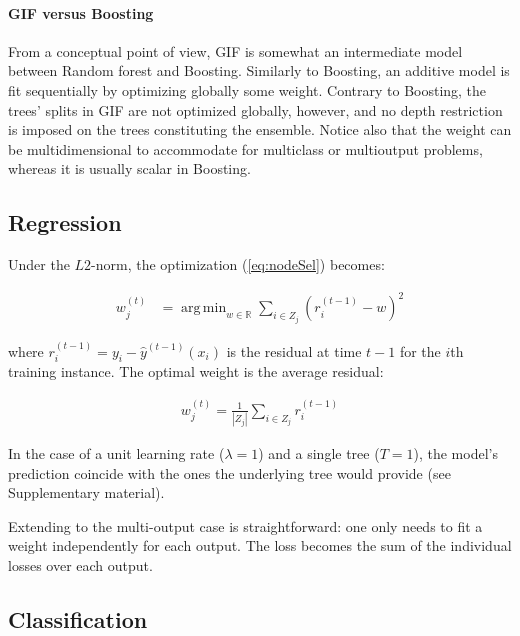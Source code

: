 \documentclass{article}
\DeclareMathOperator*{\argmin}{arg\,min}
\begin{document}
\paragraph{GIF versus Boosting}
From a conceptual point of view, GIF is somewhat an intermediate model 
between Random forest and Boosting. Similarly to Boosting, an additive model 
is fit sequentially by optimizing globally some weight. Contrary to 
Boosting, the trees' splits in GIF are not optimized globally, however, and no 
depth restriction is imposed on the trees constituting the ensemble. Notice 
also that the weight can be multidimensional to accommodate for multiclass or 
multioutput problems, whereas it is usually scalar in Boosting.


\subsection{Regression}
\label{subsec:regression}

Under the $L2$-norm, the optimization (\ref{eq:nodeSel}) becomes:

\vspace*{-\baselineskip}
\begin{align}\label{eq:L2min}
w_j^{(t)} &=  \argmin_{w \in \mathbb{R}} \sum_{i \in Z_j} \left(r_i^{(t-1)} - 
w\right)^2
\end{align}
\vspace*{-\baselineskip}

where $r_i^{(t-1)} = y_i - \hat{y}^{(t-1)}(x_i)$ is the residual at time $t-1$ 
for the $i$th training instance.
The optimal weight is the average residual:

\vspace*{-\baselineskip}
\begin{align}\label{eq:L2Solution}
w_j^{(t)} = \frac{1}{|Z_j|} \sum_{i \in Z_j} r_i^{(t-1)}
\end{align}
\vspace*{-\baselineskip}

In the case of a unit learning rate ($\lambda = 1$) and a single tree ($T=1$), 
the model's prediction coincide with the ones the underlying tree would provide 
(see Supplementary material).

Extending to the multi-output case is straightforward: one only needs to fit a 
weight independently for each output. The loss becomes the sum of the 
individual losses over each output.

\subsection{Classification}
\label{subsec:classification}
\end{document}
